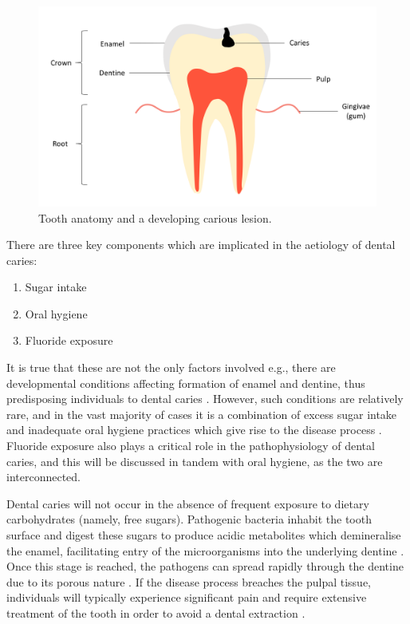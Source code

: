\begin{figure}[ht]
\centering
\includegraphics[scale = 0.25]{images/tooth}
\caption{Tooth anatomy and a developing carious lesion.}
\label{fig:anatomy}
\end{figure}

There are three key components which are implicated in the aetiology of dental caries:

\begin{enumerate}
\item Sugar intake
\item Oral hygiene
\item Fluoride exposure
\end{enumerate}

It is true that these are not the only factors involved e.g., there are developmental conditions affecting formation of enamel and dentine, thus predisposing individuals to dental caries \citep{costa2017}. However, such conditions are relatively rare, and in the vast majority of cases it is a combination of excess sugar intake and inadequate oral hygiene practices which give rise to the disease process \citep{crawford2007, barron2008, pitts2017}. Fluoride exposure also plays a critical role in the pathophysiology of dental caries, and this will be discussed in tandem with oral hygiene, as the two are interconnected.

Dental caries will not occur in the absence of frequent exposure to dietary carbohydrates (namely, free sugars). Pathogenic bacteria inhabit the tooth surface and digest these sugars to produce acidic metabolites which demineralise the enamel, facilitating entry of the microorganisms into the underlying dentine \citep{pitts2017}. Once this stage is reached, the pathogens can spread rapidly through the dentine due to its porous nature \citep{pitts2017}. If the disease process breaches the pulpal tissue, individuals will typically experience significant pain and require extensive treatment of the tooth in order to avoid a dental extraction \citep{iqbal2007}.

